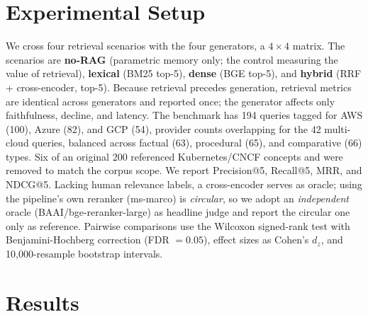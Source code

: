 \documentclass[conference]{IEEEtran}
\begin{document}
\section{Experimental Setup}
We cross four retrieval scenarios with the four generators, a $4\times4$ matrix. The scenarios are \textbf{no-RAG} (parametric memory only; the control measuring the value of retrieval), \textbf{lexical} (BM25 top-5), \textbf{dense} (BGE top-5), and \textbf{hybrid} (RRF + cross-encoder, top-5). Because retrieval precedes generation, retrieval metrics are identical across generators and reported once; the generator affects only faithfulness, decline, and latency.
The benchmark has 194 queries tagged for AWS (100), Azure (82), and GCP (54), provider counts overlapping for the 42 multi-cloud queries, balanced across factual (63), procedural (65), and comparative (66) types. Six of an original 200 referenced Kubernetes/CNCF concepts and were removed to match the corpus scope. We report Precision@5, Recall@5, MRR, and NDCG@5. Lacking human relevance labels, a cross-encoder serves as oracle; using the pipeline's own reranker (ms-marco) is \emph{circular}, so we adopt an \emph{independent} oracle (BAAI/bge-reranker-large) as headline judge and report the circular one only as reference. Pairwise comparisons use the Wilcoxon signed-rank test with Benjamini-Hochberg correction (FDR $=0.05$), effect sizes as Cohen's $d_z$, and 10{,}000-resample bootstrap intervals.
\section{Results}
\end{document}
